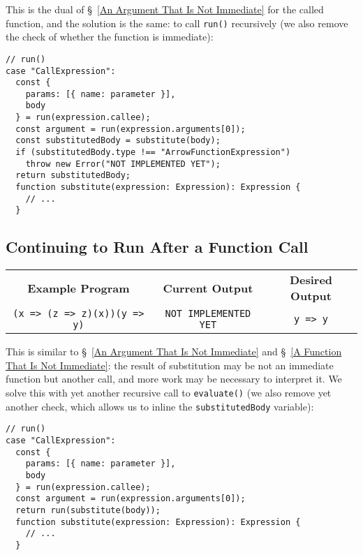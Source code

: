\documentclass[12pt, oneside]{book}
\begin{document}
\noindent This is the dual of §~\ref{An Argument That Is Not Immediate} for the called function, and the solution is the same: to call \texttt{run()} recursively (we also remove the check of whether the function is immediate):

\begin{verbatim}
// run()
case "CallExpression":
  const {
    params: [{ name: parameter }],
    body
  } = run(expression.callee);
  const argument = run(expression.arguments[0]);
  const substitutedBody = substitute(body);
  if (substitutedBody.type !== "ArrowFunctionExpression")
    throw new Error("NOT IMPLEMENTED YET");
  return substitutedBody;
  function substitute(expression: Expression): Expression {
    // ...
  }
\end{verbatim}

\subsection{Continuing to Run After a Function Call}
\label{Continuing to Run After a Function Call}

\begin{center}
\begin{tabular}{c|c|c}
\textbf{Example Program} & \textbf{Current Output} & \textbf{Desired Output} \\
\texttt{(x => (z => z)(x))(y => y)} & \texttt{NOT IMPLEMENTED YET} & \texttt{y => y} \\
\end{tabular}
\end{center}

\noindent This is similar to §~\ref{An Argument That Is Not Immediate} and §~\ref{A Function That Is Not Immediate}: the result of substitution may be not an immediate function but another call, and more work may be necessary to interpret it. We solve this with yet another recursive call to \texttt{evaluate()} (we also remove yet another check, which allows us to inline the \texttt{substitutedBody} variable):

\begin{verbatim}
// run()
case "CallExpression":
  const {
    params: [{ name: parameter }],
    body
  } = run(expression.callee);
  const argument = run(expression.arguments[0]);
  return run(substitute(body));
  function substitute(expression: Expression): Expression {
    // ...
  }
\end{verbatim}
\end{document}
